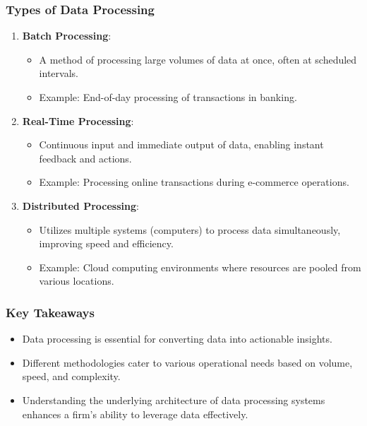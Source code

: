 \documentclass[aspectratio=169]{beamer}
\begin{document}
\begin{frame}[fragile]
    \frametitle{Types of Data Processing}
    \begin{enumerate}
        \item \textbf{Batch Processing}:
        \begin{itemize}
            \item A method of processing large volumes of data at once, often at scheduled intervals.
            \item Example: End-of-day processing of transactions in banking.
        \end{itemize}

        \item \textbf{Real-Time Processing}:
        \begin{itemize}
            \item Continuous input and immediate output of data, enabling instant feedback and actions.
            \item Example: Processing online transactions during e-commerce operations.
        \end{itemize}

        \item \textbf{Distributed Processing}:
        \begin{itemize}
            \item Utilizes multiple systems (computers) to process data simultaneously, improving speed and efficiency.
            \item Example: Cloud computing environments where resources are pooled from various locations.
        \end{itemize}
    \end{enumerate}
\end{frame}

\begin{frame}[fragile]
    \frametitle{Key Takeaways}
    \begin{itemize}
        \item Data processing is essential for converting data into actionable insights.
        \item Different methodologies cater to various operational needs based on volume, speed, and complexity.
        \item Understanding the underlying architecture of data processing systems enhances a firm's ability to leverage data effectively.
    \end{itemize}
\end{frame}
\end{document}

